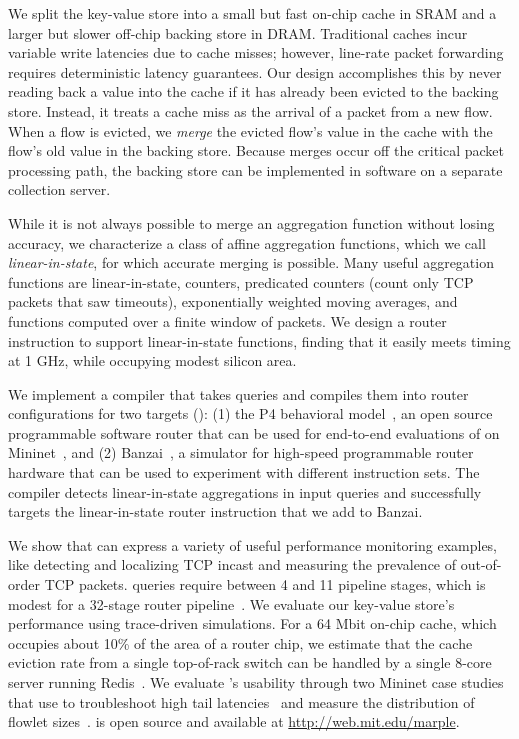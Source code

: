 We split the key-value store into a small but fast on-chip cache in SRAM and a
larger but slower off-chip backing store in DRAM. Traditional caches incur
variable write latencies due to cache misses; however, line-rate packet
forwarding requires deterministic latency guarantees. Our design accomplishes
this by never reading back a value into the cache if it has already been
evicted to the backing store. Instead, it treats a cache miss as the arrival of
a packet from a new flow. When a flow is evicted, we {\em merge} the evicted flow's value in the cache with the flow's
old value in the backing store. Because merges occur off the
critical packet processing path, the backing store can be implemented in
software on a separate collection server.%

While it is not always possible to merge an aggregation function without losing
accuracy, we characterize a class of affine aggregation functions, which we
call {\em linear-in-state}, for which accurate merging is possible.  Many
useful aggregation functions are linear-in-state, \eg counters, predicated
counters (\eg count only TCP packets that saw timeouts), exponentially weighted
moving averages, and functions computed over a finite window of packets.  We
design a router instruction to support linear-in-state functions, finding that
it easily meets timing at 1 GHz, while occupying modest silicon area.

 We implement a compiler that takes \TheSystem queries
and compiles them into router configurations for two targets ():
(1) the P4 behavioral model~\cite{p4-bmv2}, an open source programmable
software router that can be used for end-to-end evaluations of \TheSystem on
Mininet~\cite{mininet}, and (2) Banzai~\cite{domino_sigcomm}, a simulator for high-speed
programmable router hardware that can be used to experiment with different instruction sets.
The \TheSystem compiler detects linear-in-state aggregations in input queries
and successfully targets the linear-in-state router instruction that we add to
Banzai.

 We show that \TheSystem can express a variety of useful
performance monitoring examples, like detecting and localizing TCP incast and
measuring the prevalence of out-of-order TCP packets. \TheSystem queries
require between 4 and 11 pipeline stages, which is modest for a 32-stage router
pipeline~\cite{rmt}. We evaluate our key-value store's performance using
trace-driven simulations. For a 64 Mbit on-chip cache, which occupies about
10\% of the area of a \tengrouter router chip, we estimate that the cache eviction rate
from a single top-of-rack switch can be handled by a single 8-core server running
Redis~\cite{redis}.
We evaluate \TheSystem's usability through two Mininet case studies
that use \TheSystem to troubleshoot high tail latencies~\cite{barefoot-demo} and
measure the distribution of flowlet sizes~\cite{conga}. \TheSystem is open
source and available at \url{http://web.mit.edu/marple}.
